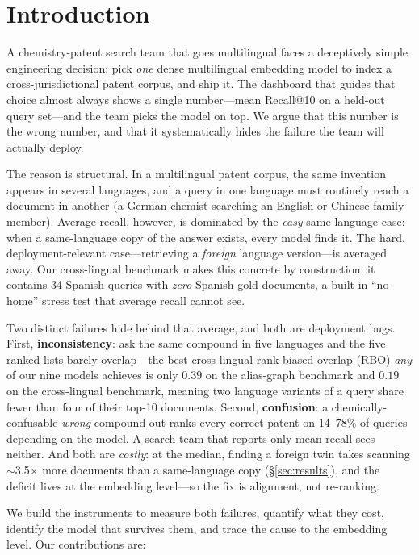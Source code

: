 \documentclass[11pt]{article}
\begin{document}
\section{Introduction}

A chemistry-patent search team that goes multilingual faces a deceptively
simple engineering decision: pick \emph{one} dense multilingual embedding model
to index a cross-jurisdictional patent corpus, and ship it. The dashboard that
guides that choice almost always shows a single number---mean Recall@10 on a
held-out query set---and the team picks the model on top. We argue that this
number is the wrong number, and that it systematically hides the failure the
team will actually deploy.

The reason is structural. In a multilingual patent corpus, the same invention
appears in several languages, and a query in one language must routinely reach
a document in another (a German chemist searching an English or Chinese family
member). Average recall, however, is dominated by the \emph{easy}
same-language case: when a same-language copy of the answer exists, every model
finds it. The hard, deployment-relevant case---retrieving a \emph{foreign}
language version---is averaged away. Our cross-lingual benchmark makes this
concrete by construction: it contains 34 Spanish queries with \emph{zero}
Spanish gold documents, a built-in ``no-home'' stress test that average recall
cannot see.

Two distinct failures hide behind that average, and both are deployment bugs.
First, \textbf{inconsistency}: ask the same compound in five languages and the
five ranked lists barely overlap---the best cross-lingual rank-biased-overlap
(RBO) \emph{any} of our nine models achieves is only $0.39$ on the alias-graph
benchmark and $0.19$ on the cross-lingual benchmark, meaning two language
variants of a query share fewer than four of their top-10 documents. Second,
\textbf{confusion}: a chemically-confusable \emph{wrong} compound out-ranks
every correct patent on $14$--$78\%$ of queries depending on the model. A search
team that reports only mean recall sees neither. And both are \emph{costly}: at
the median, finding a foreign twin takes scanning $\sim$3.5$\times$ more
documents than a same-language copy (\S\ref{sec:results}), and the deficit lives
at the embedding level---so the fix is alignment, not re-ranking.

We build the instruments to measure both failures, quantify what they cost,
identify the model that survives them, and trace the cause to the embedding
level. Our contributions are:
\end{document}
